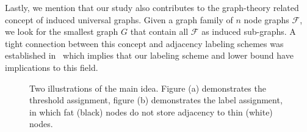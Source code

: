Lastly, we mention that our study also contributes to    the graph-theory related concept of induced universal graphs. 
Given a  graph family of $n$ node graphs  $\mathcal{F}$, we look for the smallest  graph $G$ that contain all $\mathcal{F}$ as  induced sub-graphs.
A tight connection between this concept and adjacency labeling schemes was established in~\cite{Kannan92} which implies that  our labeling scheme and lower bound have implications to this field.

\begin{figure}
\centering
{}
\caption{Two illustrations of the main idea. Figure (a) demonstrates the threshold assignment, figure (b) demonstrates the label assignment, in which fat (black) nodes do not store adjacency to thin (white) nodes.}
\end{figure}





